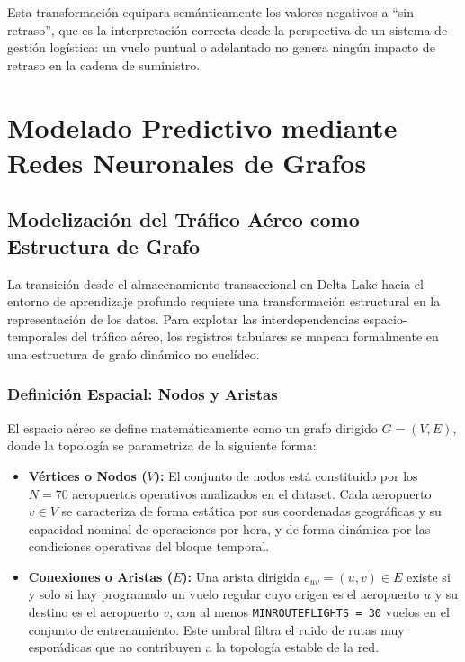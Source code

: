\documentclass[12pt,oneside,a4paper]{report}
\renewcommand{\_}{\textunderscore\allowbreak}
\begin{document}
Esta transformación equipara semánticamente los valores negativos a ``sin retraso'', que es la interpretación correcta desde la perspectiva de un sistema de gestión logística: un vuelo puntual o adelantado no genera ningún impacto de retraso en la cadena de suministro.

\chapter{Modelado Predictivo mediante Redes Neuronales de Grafos}
\label{cap:modelo}

\section{Modelización del Tráfico Aéreo como Estructura de Grafo}
\label{sec:modelizacion_grafo}

La transición desde el almacenamiento transaccional en Delta Lake hacia el entorno de aprendizaje profundo requiere una transformación estructural en la representación de los datos. Para explotar las interdependencias espacio-temporales del tráfico aéreo, los registros tabulares se mapean formalmente en una estructura de grafo dinámico no euclídeo.

\subsection{Definición Espacial: Nodos y Aristas}
\label{sub:nodos_aristas}

El espacio aéreo se define matemáticamente como un grafo dirigido $G = (V, E)$, donde la topología se parametriza de la siguiente forma:

\begin{itemize}
    \item \textbf{Vértices o Nodos ($V$):} El conjunto de nodos está constituido por los $N = 70$ aeropuertos operativos analizados en el dataset. Cada aeropuerto $v \in V$ se caracteriza de forma estática por sus coordenadas geográficas y su capacidad nominal de operaciones por hora, y de forma dinámica por las condiciones operativas del bloque temporal.
    \item \textbf{Conexiones o Aristas ($E$):} Una arista dirigida $e_{uv} = (u, v) \in E$ existe si y solo si hay programado un vuelo regular cuyo origen es el aeropuerto $u$ y su destino es el aeropuerto $v$, con al menos \texttt{MIN\_ROUTE\_FLIGHTS = 30} vuelos en el conjunto de entrenamiento. Este umbral filtra el ruido de rutas muy esporádicas que no contribuyen a la topología estable de la red.
\end{itemize}
\end{document}
